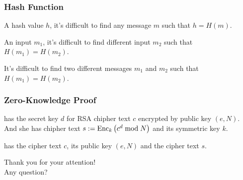 \begin{frame}
  \frametitle{Hash Function}


  
  \begin{description}
    \item<4->[Preimage Resistance] A hash value $h$,
    it's difficult to find any message $m$ such that $h = H(m)$.

    \item<4->[Second Preimage Resistance] An input $m_1$,
    it's difficult to find different input $m_2$ such that $H(m_1) = H(m_2)$.

    \item<4->[Collision resistance] It's difficult to find
    two different messages $m_1$ and $m_2$ such that $H(m_1) = H(m_2)$.
  \end{description}
\end{frame}

\begin{frame}
  \frametitle{Zero-Knowledge Proof}

  \begin{description}
    \item<2->[Prover Alice] has the secret key $d$ for
    RSA chipher text $c$ encrypted by public key $(e, N)$.
    And she has chipher text $s := \text{Enc}_{k}\left(c^d \bmod N\right)$ and
    its symmetric key $k$.
    
    \item<3->[Verifier Bob] has the cipher text $c$,
    its public key $(e, N)$ and the cipher text $s$.
  \end{description}

\end{frame}

\begin{frame}
  \centering
  {\Huge Thank you for your attention!\\
    \vspace{1em}
    Any question?
  }
\end{frame}


